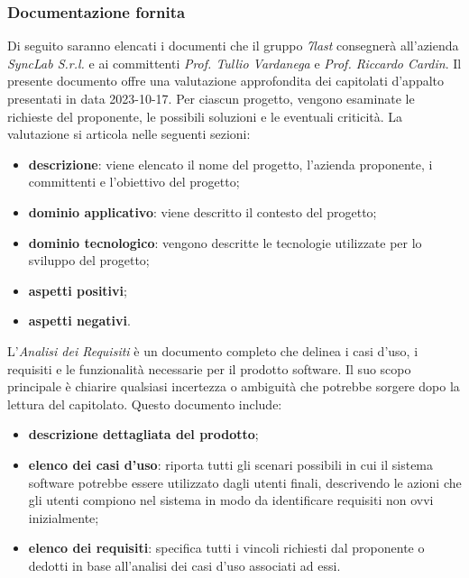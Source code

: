 \subsubsection{Documentazione fornita}
Di seguito saranno elencati i documenti che il gruppo \textit{7last} consegnerà all'azienda \textit{SyncLab S.r.l.} e ai committenti \textit{Prof. Tullio Vardanega} e \textit{Prof. Riccardo Cardin}.
Il presente documento offre una valutazione approfondita dei capitolati d'appalto presentati in data 2023-10-17. Per ciascun progetto, vengono esaminate le richieste del proponente, le possibili soluzioni e le eventuali criticità.
La valutazione si articola nelle seguenti sezioni:
\begin{itemize}
	\item \textbf{descrizione}: viene elencato il nome del progetto, l'azienda proponente, i committenti e l'obiettivo del progetto;
	\item \textbf{dominio applicativo}: viene descritto il contesto del progetto;
	\item \textbf{dominio tecnologico}: vengono descritte le tecnologie utilizzate per lo sviluppo del progetto;
	\item \textbf{aspetti positivi};
	\item \textbf{aspetti negativi}.
\end{itemize}

L'\textit{Analisi dei Requisiti} è un documento completo che delinea i casi d'uso, i requisiti e le funzionalità necessarie per il prodotto software.
Il suo scopo principale è chiarire qualsiasi incertezza o ambiguità che potrebbe sorgere dopo la lettura del capitolato.
Questo documento include:
\begin{itemize}
	\item \textbf{descrizione dettagliata del prodotto};
	\item \textbf{elenco dei casi d'uso}: riporta tutti gli scenari possibili in cui il sistema software potrebbe essere utilizzato dagli utenti finali, descrivendo le azioni che gli utenti compiono nel sistema in modo da identificare requisiti non ovvi inizialmente;
	\item \textbf{elenco dei requisiti}: specifica tutti i vincoli richiesti dal proponente o dedotti in base all'analisi dei casi d'uso associati ad essi.
\end{itemize}

